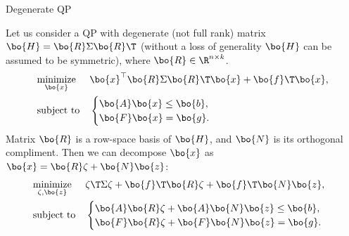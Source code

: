 \documentclass{beamer}
\begin{document}
\begin{frame}{Degenerate QP}
	\begin{flushleft}
		
		Let us consider a QP with degenerate (not full rank) matrix $\bo{H} = \bo{R} \Sigma \bo{R}\T$ (without a loss of generality $\bo{H}$ can be assumed to be symmetric), where $\bo{R} \in \R^{n \times k}$.
		\begin{equation}
			\begin{aligned}
				& \underset{\bo{x}}{\text{minimize}}
				& & \bo{x}^\top \bo{R} \Sigma \bo{R}\T \bo{x} + \bo{f}\T\bo{x}, \\
				& \text{subject to}
				& & \begin{cases}
					\bo{A}\bo{x} \leq \bo{b}, \\
					\bo{F}\bo{x} = \bo{g}.
				\end{cases}
			\end{aligned}
		\end{equation}
		Matrix $\bo{R}$ is a row-space basis of $\bo{H}$, and $\bo{N}$ is its orthogonal compliment. Then we can decompose $\bo{x}$ as $\bo{x} = \bo{R}\zeta+\bo{N}\bo{z}$:
		\begin{equation}
			\begin{aligned}
				& \underset{\zeta, \bo{z}}{\text{minimize}}
				& & \zeta\T \Sigma \zeta + \bo{f}\T\bo{R}\zeta+\bo{f}\T\bo{N}\bo{z}, \\
				& \text{subject to}
				& & \begin{cases}
					\bo{A}\bo{R}\zeta+\bo{A}\bo{N}\bo{z} \leq \bo{b}, \\
					\bo{F}\bo{R}\zeta+\bo{F}\bo{N}\bo{z} = \bo{g}.
				\end{cases}
			\end{aligned}
		\end{equation}
		
	\end{flushleft}
\end{frame}












%
%
\end{document}
